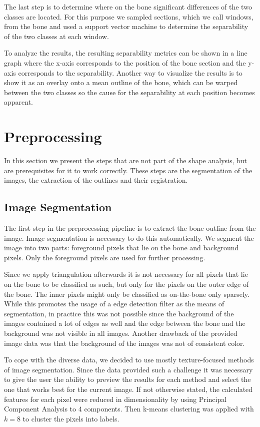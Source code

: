 \documentclass[pdftex,12pt,a4paper]{report}
\begin{document}
The last step is to determine where on the bone significant differences of the two classes are located. For this purpose we sampled sections, which we call windows, from the bone and used a support vector machine to determine the separability of the two classes at each window.

To analyze the results, the resulting separability metrics can be shown in a line graph where the x-axis corresponds to the position of the bone section and the y-axis corresponds to the separability. Another way to visualize the results is to show it as an overlay onto a mean outline of the bone, which can be warped between the two classes so the cause for the separability at each position becomes apparent.

\section{Preprocessing}

In this section we present the steps that are not part of the shape analysis, but are prerequisites for it to work correctly. These steps are the segmentation of the images, the extraction of the outlines and their registration.

\subsection{Image Segmentation}
\label{sub:segmentation}

The first step in the preprocessing pipeline is to extract the bone outline from the image. Image segmentation
is necessary to do this automatically. We segment the image into two parts: foreground pixels that lie on the bone and background pixels. Only the foreground pixels are used for further processing.

Since we apply triangulation afterwards it is not necessary for all pixels that lie on the bone
to be classified as such, but only for the pixels on the outer edge of the bone. The inner pixels
might only be classified as on-the-bone only sparsely. While this promotes the usage of a edge detection
filter as the means of segmentation, in practice this was not possible since the background of the
images contained a lot of edges as well and the edge between the bone and the background was not
visible in all images. Another drawback of the provided image data was that the background of the images
was not of consistent color.

To cope with the diverse data, we decided to use mostly texture-focused methods of image segmentation. Since the data provided such a challenge it was necessary to give the user the ability to preview the results for each method and select the one that works best for the current image. If not otherwise stated, the calculated features for each pixel were reduced in dimensionality by using Principal Component Analysis to $4$ components. Then k-means clustering was applied with $k=8$ to cluster the pixels into labels.
\end{document}
